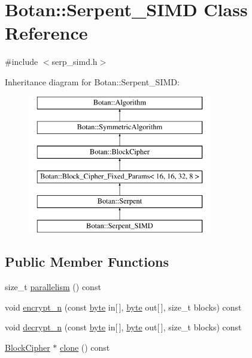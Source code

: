 \hypertarget{classBotan_1_1Serpent__SIMD}{\section{Botan\-:\-:Serpent\-\_\-\-S\-I\-M\-D Class Reference}
\label{classBotan_1_1Serpent__SIMD}
}


{\ttfamily \#include $<$serp\-\_\-simd.\-h$>$}

Inheritance diagram for Botan\-:\-:Serpent\-\_\-\-S\-I\-M\-D\-:\begin{figure}[H]
\begin{center}
\leavevmode
\includegraphics[height=6.000000cm]{classBotan_1_1Serpent__SIMD}
\end{center}
\end{figure}
\subsection*{Public Member Functions}
\begin{DoxyCompactItemize}
\item 
size\-\_\-t \hyperlink{classBotan_1_1Serpent__SIMD_a61e8fa4a2a69719d049555a833d9ba81}{parallelism} () const 
\item 
void \hyperlink{classBotan_1_1Serpent__SIMD_a2b8c97fb8da84ca6c606083746840e1a}{encrypt\-\_\-n} (const \hyperlink{namespaceBotan_a7d793989d801281df48c6b19616b8b84}{byte} in\mbox{[}$\,$\mbox{]}, \hyperlink{namespaceBotan_a7d793989d801281df48c6b19616b8b84}{byte} out\mbox{[}$\,$\mbox{]}, size\-\_\-t blocks) const 
\item 
void \hyperlink{classBotan_1_1Serpent__SIMD_a62ef06bb09d5b78042285602786cb8b2}{decrypt\-\_\-n} (const \hyperlink{namespaceBotan_a7d793989d801281df48c6b19616b8b84}{byte} in\mbox{[}$\,$\mbox{]}, \hyperlink{namespaceBotan_a7d793989d801281df48c6b19616b8b84}{byte} out\mbox{[}$\,$\mbox{]}, size\-\_\-t blocks) const 
\item 
\hyperlink{classBotan_1_1BlockCipher}{Block\-Cipher} $\ast$ \hyperlink{classBotan_1_1Serpent__SIMD_a5f6c6089e6598a2bf2a26caef87fdcea}{clone} () const 
\end{DoxyCompactItemize}

